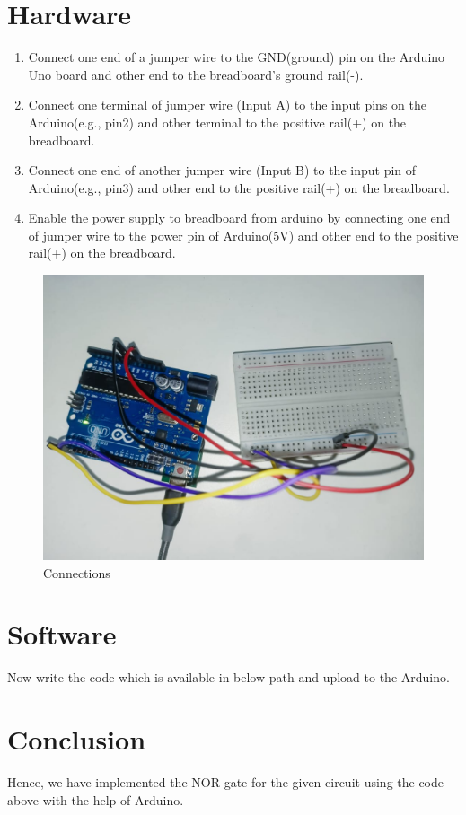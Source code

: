 \documentclass[10pt,a4paper]{article}
\begin{document}
	\section{Hardware}
	\begin{enumerate}
		\item Connect one end of a jumper wire to the GND(ground) pin on the Arduino Uno board and other end to the breadboard's ground rail(-).
		\item Connect one terminal of jumper wire (Input A) to the input pins on the Arduino(e.g., pin2) and other terminal to the positive rail(+) on the breadboard.
		\item Connect one end of another jumper wire (Input B) to the input pin of Arduino(e.g., pin3) and other end to the positive rail(+) on the breadboard.
		\item Enable the power supply to breadboard from arduino by connecting one end of jumper wire to the power pin of Arduino(5V) and other end to the positive rail(+) on the breadboard.
	\end{enumerate}
	\begin{figure}[h!]
		\centering
		\includegraphics[width=0.3\columnwidth]{21-1.jpg}
		\caption{Connections}
		\label{fig:connections}
	\end{figure}
	\section{Software}
	Now write the code which is available in below path and upload to the Arduino. \\
	\section{Conclusion}
	Hence, we have implemented the NOR gate for the given circuit using the code above with the help of Arduino.
\end{document}
